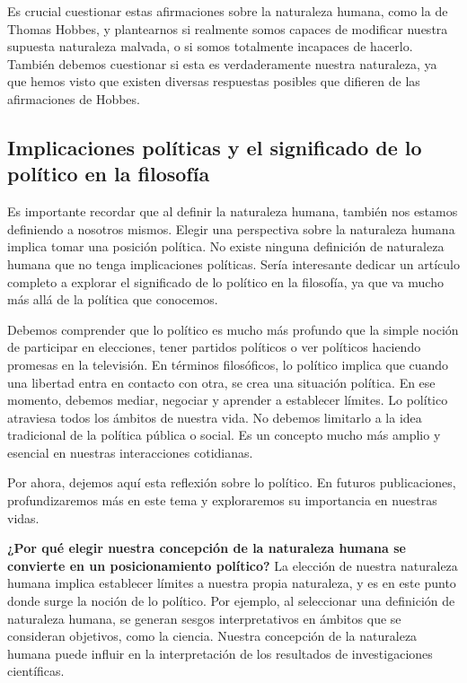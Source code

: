 \documentclass[
  a4paper,
]{article}
\begin{document}
Es crucial cuestionar estas afirmaciones sobre la naturaleza humana,
como la de Thomas Hobbes, y plantearnos si realmente somos capaces de
modificar nuestra supuesta naturaleza malvada, o si somos totalmente
incapaces de hacerlo. También debemos cuestionar si esta es
verdaderamente nuestra naturaleza, ya que hemos visto que existen
diversas respuestas posibles que difieren de las afirmaciones de Hobbes.

\subsection{Implicaciones políticas y el significado de lo político en
la
filosofía}\label{implicaciones-poluxedticas-y-el-significado-de-lo-poluxedtico-en-la-filosofuxeda}

Es importante recordar que al definir la naturaleza humana, también nos
estamos definiendo a nosotros mismos. Elegir una perspectiva sobre la
naturaleza humana implica tomar una posición política. No existe ninguna
definición de naturaleza humana que no tenga implicaciones políticas.
Sería interesante dedicar un artículo completo a explorar el significado
de lo político en la filosofía, ya que va mucho más allá de la política
que conocemos.

Debemos comprender que lo político es mucho más profundo que la simple
noción de participar en elecciones, tener partidos políticos o ver
políticos haciendo promesas en la televisión. En términos filosóficos,
lo político implica que cuando una libertad entra en contacto con otra,
se crea una situación política. En ese momento, debemos mediar, negociar
y aprender a establecer límites. Lo político atraviesa todos los ámbitos
de nuestra vida. No debemos limitarlo a la idea tradicional de la
política pública o social. Es un concepto mucho más amplio y esencial en
nuestras interacciones cotidianas.

Por ahora, dejemos aquí esta reflexión sobre lo político. En futuros
publicaciones, profundizaremos más en este tema y exploraremos su
importancia en nuestras vidas.

\textbf{¿Por qué elegir nuestra concepción de la naturaleza humana se
convierte en un posicionamiento político?} La elección de nuestra
naturaleza humana implica establecer límites a nuestra propia
naturaleza, y es en este punto donde surge la noción de lo político. Por
ejemplo, al seleccionar una definición de naturaleza humana, se generan
sesgos interpretativos en ámbitos que se consideran objetivos, como la
ciencia. Nuestra concepción de la naturaleza humana puede influir en la
interpretación de los resultados de investigaciones científicas.
\end{document}
